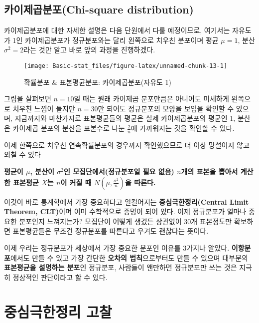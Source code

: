 \documentclass[]{book}
\begin{document}
\subsection{카이제곱분포(Chi-square
distribution)}\label{uxce74uxc774uxc81cuxacf1uxbd84uxd3ecchi-square-distribution}

카이제곱분포에 대한 자세한 설명은 다음 단원에서 다룰 예정이므로,
여기서는 자유도가 1인 카이제곱분포가 정규분포와는 달리 왼쪽으로 치우친
분포이며 평균 \(\mu=1\), 분산 \(\sigma^2=2\)라는 것만 알고 바로 앞의
과정을 진행하겠다.

\begin{figure}

{\centering \texttt{[image: Basic-stat\_files/figure-latex/unnamed-chunk-13-1]} 

}

\caption{확률분포 \& 표본평균분포: 카이제곱분포(자유도 1)}\label{fig:unnamed-chunk-13}
\end{figure}

그림을 살펴보면 \(n=10\)일 때는 원래 카이제곱 분포만큼은 아니어도
미세하게 왼쪽으로 치우친 느낌이 들지만 \(n=30\)만 되어도 정규분포의
모양을 보임을 확인할 수 있으며, 지금까지와 마찬가지로 표본평균들의
평균은 실제 카이제곱분포의 평균인 1, 분산은 카이제곱 분포의 분산을
표본수로 나눈 \(\frac{2}{n}\)에 가까워지는 것을 확인할 수 있다.

이제 한쪽으로 치우친 연속확률분포의 경우까지 확인했으므로 더 이상
망설이지 않고 외칠 수 있다

\textbf{평균이 \(\mu\), 분산이 \(\sigma^2\)인 모집단에서(정규분포일 필요
없음) \(n\)개의 표본을 뽑아서 계산한 표본평균 \(\bar{X}\)는 \(n\)이 커질
때 \(N(\mu,\frac{\sigma^2}{n})\)을 따른다.}

이것이 바로 통계학에서 가장 중요하다고 일컬어지는
\textbf{중심극한정리(Central Limit Theorem, CLT)}이며 이미 수학적으로
증명이 되어 있다. 이제 정규분포가 얼마나 중요한 분포인지 느껴지는가?
모집단이 어떻게 생겼든 상관없이 30개 표본정도만 확보하면 표본평균들은
무조건 정규분포를 따른다고 우겨도 괜찮다는 뜻이다.

이제 우리는 정규분포가 세상에서 가장 중요한 분포인 이유를 3가지나
알았다. \textbf{이항분포}에서도 만들 수 있고 가장 간단한 \textbf{오차의
법칙}으로부터도 만들 수 있으며 대부분의 \textbf{표본평균을 설명하는
분포}인 정규분포, 사람들이 왠만하면 정규분포만 쓰는 것은 지극히 정상적인
판단이라고 할 수 있다.

\section{중심극한정리
고찰}\label{uxc911uxc2ecuxadf9uxd55cuxc815uxb9ac-uxace0uxcc30}
\end{document}
